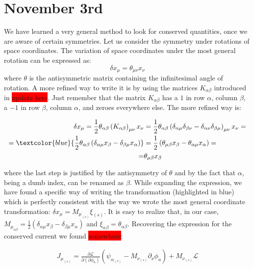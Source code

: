 \documentclass[class=article]{standalone}
\begin{document}
\section{November 3rd}
We have learned a very general method to look for conserved quantities, once we are aware of certain symmetries. Let us consider the symmetry under rotations of space coordinates. The variation of space coordinates under the most general rotation can be expressed as:
\begin{equation}
\delta x_{\mu}=\theta_{\mu\nu}x_{\nu}
\end{equation}
where $\theta$ is the antisymmetric matrix containing the infinitesimal angle of rotation.
A more refined way to write it is by using the matrices $K_{\alpha\beta}$ introduced in \colorbox{red}{update here}. Just remember that the matrix $K_{\alpha\beta}$ has a $1$ in row $\alpha$, column $\beta$, a $-1$ in row $\beta$, column $\alpha$, and zeroes everywhere else. The more refined way is:

\begin{align*}
\delta x_{\mu}=\frac{1}{2}\theta_{\alpha\beta}\left(K_{\alpha\beta}\right)_{\mu\nu}x_{\nu}
&=\frac{1}{2}\theta_{\alpha\beta}\left(\delta_{\alpha\mu}\delta_{\beta\nu}-\delta_{\alpha\nu}\delta_{\beta\mu}\right)_{\mu\nu}x_{\nu}= \\
=\textcolor{blue}{\frac{1}{2}\theta_{\alpha\beta}\left(\delta_{\alpha\mu}x_{\beta}-\delta_{\beta\mu}x_{\alpha}\right)}&=\frac{1}{2}\left(\theta_{\mu\beta}x_{\beta}-\theta_{\alpha\mu}x_{\alpha}\right)=\\
=&\theta_{\mu\beta}x_{\beta}
\end{align*}

where the last step is justified by the antisymmetry of $\theta$ and by the fact that $\alpha$, being a dumb index, can be renamed as $\beta$.
While expanding the expression, we have found a specific way of writing the transformation (highlighted in blue) which is perfectly consistent with the way we wrote the most general coordinate transformation: $\delta x_{\mu}=M_{\mu_{(s)}}\xi_{(s)}$. It is easy to realize that, in our case, $M_{\mu_{\alpha\beta}}=\frac{1}{2}\left(\delta_{\alpha\mu}x_{\beta}-\delta_{\beta\mu}x_{\alpha}\right)$ and $\xi_{\alpha\beta}=\theta_{\alpha\beta}$.
Recovering the expression for the conserved current we found \colorbox{red}{somewhere}:

\begin{align*}
J_{\mu_{(s)}}=\frac{\partial\mathcal{L}}{\partial(\partial\phi_a)}\left(\psi_{\alpha_{(s)}}-M_{\nu_{(s)}}\partial_{\nu}\phi_a\right)+M_{\nu_{(s)}}\mathcal{L}
\end{align*}
\end{document}
